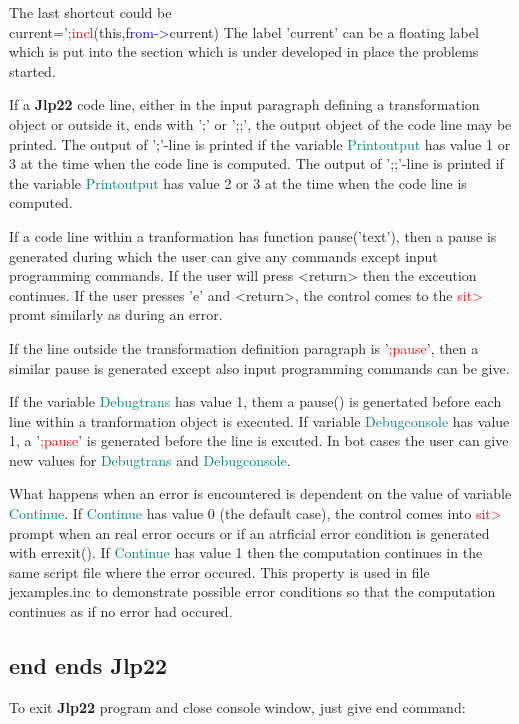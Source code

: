 {The last shortcut could be \\ 
current='\textcolor{Red}{;incl}(this,\textcolor{blue}{from->}current) 
The label 'current' can be a floating label which is put into the section which is under developed 
in place the problems started. 
 
If a \textbf{Jlp22} code line, either in the input paragraph defining a transformation object 
or outside it, ends with ';' or ';;', the output object of the code line may be printed. 
The output of ';'-line is printed if the variable \textcolor{teal}{Printoutput} has value 1 or 3 at the time when the 
code line is computed. 
The output of ';;'-line is printed if the variable \textcolor{teal}{Printoutput} has value 2 or 3 at the time when the 
code line is computed. 
 
If a code line within a tranformation has function \textcolor{VioletRed}{pause}('text'), then a pause is generated during which 
the user can give any commands except 
input programming commands. If the user will press <return> then the exceution continues. If the user 
presses 'e' and <return>, the control comes to the \textcolor{Red}{sit>} promt similarly as during an error. 
 
If the line outside the transformation definition paragraph is '\textcolor{Red}{;pause}', then 
a similar pause is generated except also input programming commands can be give. 
 
If the variable \textcolor{teal}{Debugtrans} has value 1, them a \textcolor{VioletRed}{pause}() is genertated before each line within 
a tranformation object is executed.  If variable \textcolor{teal}{Debugconsole} has value 1, 
a '\textcolor{Red}{;pause}' is generated before  the line is excuted. In bot cases the user can 
give new values for \textcolor{teal}{Debugtrans} and \textcolor{teal}{Debugconsole}. 
 
What happens when an error is encountered is dependent on the value of variable \textcolor{teal}{Continue}. If \textcolor{teal}{Continue} has 
value 0 (the default case), the control comes into \textcolor{Red}{sit>} prompt when an real error occurs or if an atrficial 
error condition is generated with \textcolor{VioletRed}{errexit}(). If \textcolor{teal}{Continue} has value 1 then the computation continues in 
the same script file where the error occured. This property is used in file jexamples.inc to demonstrate 
possible error conditions so that the computation continues as if no error had occured. 
 
 
\subsection{end ends \textbf{Jlp22}} 
\label{exit} 
To exit \textbf{Jlp22} program and close console window, just give end command: 
 
}
